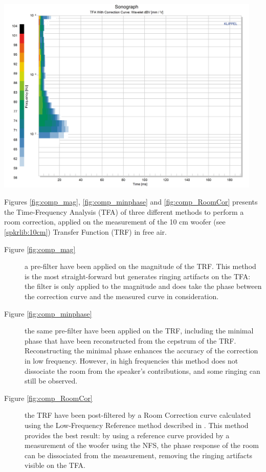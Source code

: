 \documentclass{report}
\begin{document}
\begin{minipage}{0.33\textwidth}
\begin{center}
	\includegraphics[width=0.95\textwidth]{RoomComp/Sonograph_RoomCor} 
    \captionsetup{hypcap=false} 
	\label{fig:comp_RoomCor}
\end{center}
\end{minipage}
\vspace{0.1cm}

Figures \ref{fig:comp_mag}, \ref{fig:comp_minphase} and \ref{fig:comp_RoomCor} presents the Time-Frequency Analysis (TFA) of three different methods to perform a room correction, applied on the measurement of the 10 cm woofer (see \ref{spkrlib:10cm}) Transfer Function (TRF) in free air.
\begin{description}
\item[Figure \ref{fig:comp_mag}] a pre-filter have been applied on the magnitude of the TRF. This method is the most straight-forward but generates ringing artifacts on the TFA: the filter is only applied to the magnitude and does take the phase between the correction curve and the measured curve in consideration. 
\item[Figure \ref{fig:comp_minphase}] the same pre-filter have been applied on the TRF, including the minimal phase that have been reconstructed from the cepstrum of the TRF. Reconstructing the minimal phase enhances the accuracy of the correction in low frequency. However, in high frequencies this method does not dissociate the room from the speaker's contributions, and some ringing can still be observed.
\item[Figure \ref{fig:comp_RoomCor}] the TRF have been post-filtered by a Room Correction curve calculated using the Low-Frequency Reference method described in \citep[][sect.~4]{aeswb}. This method provides the best result: by using a reference curve provided by a measurement of the woofer using the NFS, the phase response of the room can be dissociated from the measurement, removing the ringing artifacts visible on the TFA. 
\end{description}
\end{document}
